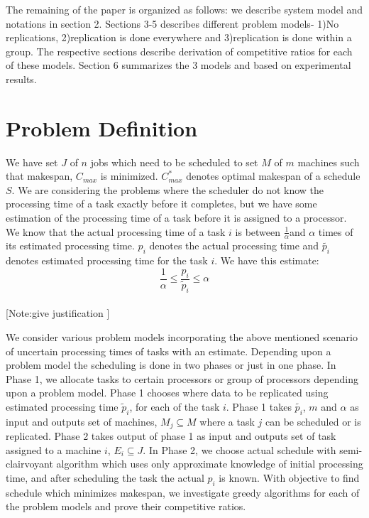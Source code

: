 \documentclass[10pt, conference, compsocconf]{IEEEtran}
\begin{document}
 The remaining of the paper is organized as follows: we describe system model and notations in section 2. Sections 3-5 describes different problem models- 1)No replications, 2)replication is done everywhere and 3)replication is done within a group. The respective sections describe derivation of competitive ratios for each of these models. Section 6 summarizes the 3 models and based on experimental results.  

\section{Problem Definition}
We have set $J$ of $n$ jobs which need to be scheduled to set $M$ of $m$ machines such that makespan, $C_{max}$ is minimized.   $C_{max}^{*}$ denotes optimal makespan of a schedule $S$.   We are considering the problems where the scheduler do not know the processing time of a task exactly before it completes, but we have some estimation of the processing time of a task before it is  assigned to a processor. We know that the actual processing time of a task $i$ is between $\frac{1}{\alpha}$and $\alpha$ times of its estimated processing time. $p_i$ denotes the actual processing time and $\tilde {p_i}$ denotes
estimated processing time for the task $i$.  We have this estimate:\\
 \begin{equation} 
\frac{1}{\alpha}\leq \frac{p_{i}}{\tilde{p}_{i}}\leq \alpha
\end{equation}\\

[Note:give justification ]


We consider various problem models  incorporating the above mentioned scenario of uncertain processing times of tasks with an estimate. Depending upon  a problem model the scheduling is done in two phases or just in one phase. In Phase 1, we allocate tasks to certain processors or group of processors depending upon a problem model.  Phase 1 chooses where data to be  replicated using estimated processing time $\tilde p_i $, for each of the task $i$. Phase 1 takes $\tilde{p_i}$, $m$ and $\alpha$ as input and outputs set of machines, $M_j \subseteq M $ where a task $j$ can be scheduled or is replicated. Phase 2 takes output of phase 1 as input and outputs set of task assigned to a machine $i$, $E_i \subseteq J$.   In Phase 2, we choose actual schedule with semi-clairvoyant algorithm which uses only approximate knowledge of initial processing time, and after scheduling the task the actual $p_i$ is known.  With  objective to find schedule which minimizes makespan, we investigate greedy algorithms for each of the problem models and prove their competitive ratios. 
\end{document}
